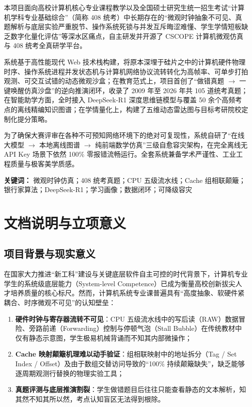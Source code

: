 \documentclass[UTF8,a4paper,11pt]{ctexart}
\begin{document}
本项目面向高校计算机核心专业课程教学以及全国硕士研究生统一招生考试“计算机学科专业基础综合”（简称 408 统考）中长期存在的“微观时钟抽象不可见、真题解析与底层实验严重脱节、操作系统死锁与并发互斥晦涩难懂、学生学情短板缺乏数字化量化评估”等深水区痛点，自主研发并开源了 CSCOPE 计算机微观仿真与 408 统考全真研学平台。

系统基于高性能现代 Web 技术栈构建，将原本深埋于硅片之中的计算机硬件物理时序、操作系统进程并发状态机与计算机网络协议流转转化为高帧率、可单步打拍观测、可交互试错的动态微观沙盒；在教育范式上，项目首创了“做错真题 $\rightarrow$ 一键唤醒仿真沙盘”的逆向推演闭环，收录了 2009 年至 2026 年共 105 道统考真题；在智能助学方面，全时接入 DeepSeek-R1 深度思维链模型与覆盖 50 余个高频考点的离线精编知识图谱；在学情量化上，构建了五维动态雷达图与目标考研院校定制化提分策略。

为了确保大赛评审在各种不可预知网络环境下的绝对可复现性，系统自研了“在线大模型 $\rightarrow$ 本地离线图谱 $\rightarrow$ 纯前端数学仿真”三级自愈容灾架构，在完全离线无 API Key 场景下依然 100\% 零报错流畅运行。全套系统兼备学术严谨性、工业工程质量与极客美学质感。

\textbf{关键词：} 微观时钟仿真；408 统考真题；CPU 五级流水线；Cache 组相联颠簸；银行家算法；DeepSeek-R1；学习画像；数据闭环；可降级容灾

\newpage

\section{文档说明与立项意义}

\subsection{项目背景与现实意义}
在国家大力推进“新工科”建设与关键底层软件自主可控的时代背景下，计算机专业学生的系统级底层能力（System-level Competence）已成为衡量高校创新拔尖人才培养质量的核心标尺。然而，计算机系统专业课普遍具有“高度抽象、软硬件紧耦合、时序微观不可见”的认知壁垒：
\begin{enumerate}
    \item \textbf{硬件时钟与寄存器流转不可见}：CPU 五级流水线中的写后读（RAW）数据冒险、旁路前递（Forwarding）控制与停顿气泡（Stall Bubble）在传统教材中仅有静态示意图，学生极易机械背诵而不知其内部微操作；
    \item \textbf{Cache 映射颠簸机理难以动手验证}：组相联映射中的地址拆分（Tag / Set Index / Offset）及由于数组交替访问导致的“100\% 持续颠簸缺失”，缺乏能够逐周期观测行替换的物理实验工具；
    \item \textbf{真题评测与底层推演割裂}：学生做错题目后往往只能查看静态的文本解析，知其然不知其所以然，考点认知盲区无法得到根除。
\end{enumerate}
\end{document}
